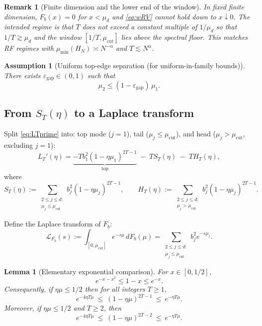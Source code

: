 \documentclass[11pt]{article}
\newtheorem{lemma}{Lemma}
\newtheorem{assumption}{Assumption}
\newtheorem{remark}{Remark}
\begin{document}
\begin{remark}[Finite dimension and the lower end of the window]\label{rem:finite-d}
In fixed finite dimension, $F_b(x)=0$ for $x<\mu_d$ and \eqref{eq:wRV} cannot hold down to
$x\downarrow 0$. The intended regime is that $T$ does not exceed a constant multiple of
$1/\mu_d$ so that $1/T\gtrsim \mu_d$ and the window $[1/T,\mu_{\mathrm{cut}}]$ lies above the
spectral floor. This matches RF regimes with $\mu_{\min}(H_N)\asymp N^{-\alpha}$ and
$T\lesssim N^\alpha$.
\end{remark}

\begin{assumption}[Uniform top-edge separation (for uniform-in-family bounds)]\label{ass:gap}
There exists $\varepsilon_{\mathrm{gap}}\in(0,1)$ such that
\[
\mu_2 \le (1-\varepsilon_{\mathrm{gap}})\,\mu_1.
\]
\end{assumption}

\subsection{From $S_T(\eta)$ to a Laplace transform}

Split \eqref{eq:LTprime} into: top mode ($j=1$), tail ($\mu_j\le \mu_{\mathrm{cut}}$),
and head ($\mu_j>\mu_{\mathrm{cut}}$, excluding $j=1$):
\[
L_T'(\eta)=
\underbrace{-T b_1^2(1-\eta\mu_1)^{2T-1}}_{\text{top}}
\;-\;T S_T(\eta)\;-\;T H_T(\eta),
\]
where
\[
S_T(\eta):=\sum_{\substack{2\le j\le d:\\ \mu_j\le\mu_{\mathrm{cut}}}}
b_j^2(1-\eta\mu_j)^{2T-1},
\qquad
H_T(\eta):=\sum_{\substack{2\le j\le d:\\ \mu_j>\mu_{\mathrm{cut}}}}
b_j^2(1-\eta\mu_j)^{2T-1}.
\]

Define the Laplace transform of $F_b$:
\[
\mathcal L_{F_b}(s):=\int_{[0,\mu_{\mathrm{cut}}]}e^{-s\mu}\,dF_b(\mu)
=\sum_{\substack{2\le j\le d:\\ \mu_j\le\mu_{\mathrm{cut}}}} b_j^2 e^{-s\mu_j}.
\]

\begin{lemma}[Elementary exponential comparison]\label{lem:exp-comp}
For $x\in[0,1/2]$,
\[
e^{-x-x^2}\le 1-x\le e^{-x}.
\]
Consequently, if $\eta\mu\le 1/2$ then for all integers $T\ge 1$,
\[
e^{-4\eta T\mu}\ \le\ (1-\eta\mu)^{2T-1}\ \le\ e^{-\eta T\mu}.
\]
Moreover, if $\eta\mu\le 1/2$ and $T\ge 2$, then
\[
e^{-4\eta T\mu}\ \le\ (1-\eta\mu)^{2T-2}\ \le\ e^{-\eta T\mu}.
\]
\end{lemma}
\end{document}
